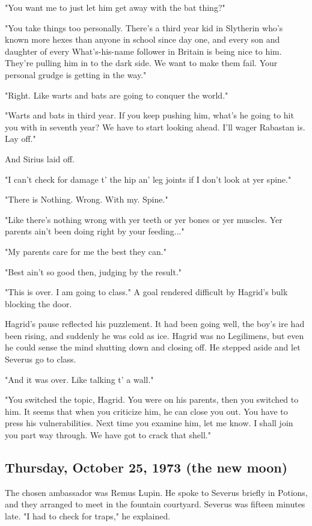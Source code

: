 \documentclass[a4paper,11pt]{article}
\begin{document}
"You want me to just let him get away with the bat thing?"

"You take things too personally. There's a third year kid in Slytherin who's known more hexes than anyone in school since day one, and every son and daughter of every What's-his-name follower in Britain is being nice to him. They're pulling him in to the dark side. We want to make them fail. Your personal grudge is getting in the way."

"Right. Like warts and bats are going to conquer the world."

"Warts and bats in third year. If you keep pushing him, what's he going to hit you with in seventh year? We have to start looking ahead. I'll wager Rabastan is. Lay off."

And Sirius laid off.

"I can't check for damage t' the hip an' leg joints if I don't look at yer spine."

"There is Nothing. Wrong. With my. Spine."

"Like there's nothing wrong with yer teeth or yer bones or yer muscles. Yer parents ain't been doing right by your feeding..."

"My parents care for me the best they can."

"Best ain't so good then, judging by the result."

"This is over. I am going to class." A goal rendered difficult by Hagrid's bulk blocking the door.

Hagrid's pause reflected his puzzlement. It had been going well, the boy's ire had been rising, and suddenly he was cold as ice. Hagrid was no Legilimens, but even he could sense the mind shutting down and closing off. He stepped aside and let Severus go to class.

"And it was over. Like talking t' a wall."

"You switched the topic, Hagrid. You were on his parents, then you switched to him. It seems that when you criticize him, he can close you out. You have to press his vulnerabilities. Next time you examine him, let me know. I shall join you part way through. We have got to crack that shell."

\subsection{Thursday, October 25, 1973 (the new moon)}

The chosen ambassador was Remus Lupin. He spoke to Severus briefly in Potions, and they arranged to meet in the fountain courtyard. Severus was fifteen minutes late. "I had to check for traps," he explained.
\end{document}
